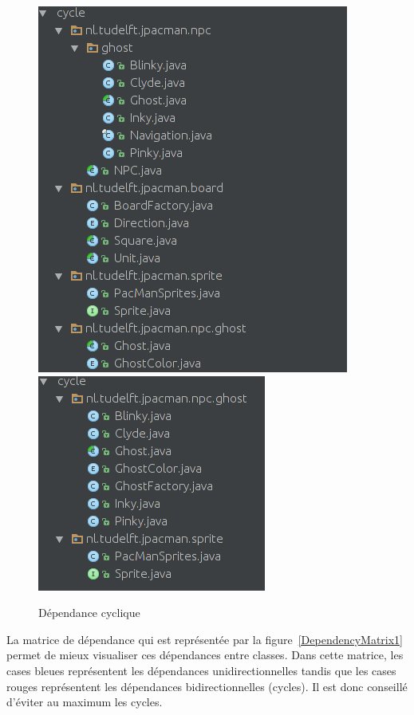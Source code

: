 \documentclass[12pt, openany]{report}
\begin{document}
\begin{figure}[!h]
	\centering
	\includegraphics[scale=0.4]{Images/DependencyCycle5.png}
	\includegraphics[scale=0.5]{Images/DependencyCycle6.png} 
		\caption{Dépendance cyclique}
 
	\label{DependencyCycle1}
\end{figure}

\newpage

La matrice de dépendance qui est représentée par la figure~\ref{DependencyMatrix1} permet de mieux visualiser ces dépendances entre classes. Dans cette matrice, les cases bleues représentent les dépendances unidirectionnelles tandis que les cases rouges représentent les dépendances bidirectionnelles (cycles). Il est donc conseillé d'éviter au maximum les cycles.
\end{document}
